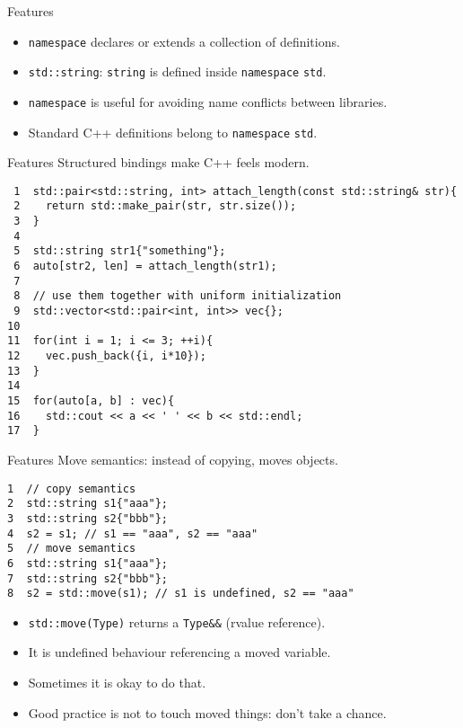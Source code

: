 \documentclass[presentation]{beamer}
\begin{document}
\begin{frame}[label={sec:org782925c},fragile]{Features}
 \begin{itemize}
\item \texttt{namespace} declares or extends a collection of definitions.
\item \texttt{std::string}: \texttt{string} is defined inside \texttt{namespace} \texttt{std}.
\item \texttt{namespace} is useful for avoiding name conflicts between
libraries.
\item Standard C++ definitions belong to \texttt{namespace} \texttt{std}.
\end{itemize}
\end{frame}

\begin{frame}[label={sec:org2fef684},fragile]{Features}
 Structured bindings make C++ feels modern.

\begin{verbatim}
 1  std::pair<std::string, int> attach_length(const std::string& str){
 2    return std::make_pair(str, str.size());
 3  }
 4  
 5  std::string str1{"something"};
 6  auto[str2, len] = attach_length(str1);
 7  
 8  // use them together with uniform initialization
 9  std::vector<std::pair<int, int>> vec{};
10  
11  for(int i = 1; i <= 3; ++i){
12    vec.push_back({i, i*10});
13  }
14  
15  for(auto[a, b] : vec){
16    std::cout << a << ' ' << b << std::endl;
17  }
\end{verbatim}
\end{frame}

\begin{frame}[label={sec:org9601d20},fragile]{Features}
 Move semantics: instead of copying, moves objects.

\begin{verbatim}
1  // copy semantics
2  std::string s1{"aaa"};
3  std::string s2{"bbb"};
4  s2 = s1; // s1 == "aaa", s2 == "aaa"
5  // move semantics
6  std::string s1{"aaa"};
7  std::string s2{"bbb"};
8  s2 = std::move(s1); // s1 is undefined, s2 == "aaa"
\end{verbatim}

\begin{itemize}
\item \texttt{std::move(Type)} returns a \texttt{Type\&\&} (rvalue reference).
\item It is undefined behaviour referencing a moved variable.
\item Sometimes it is okay to do that.
\item Good practice is not to touch moved things: don't take a chance.
\end{itemize}
\end{frame}
\end{document}
